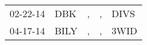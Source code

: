 \begin{supertabular}{p{0.07\textwidth}p{0.06\textwidth}p{0.02\textwidth}p{0.02\textwidth}p{0.06\textwidth}}
 02-22-14\textsuperscript{} &   DBK\textsuperscript{} &  , &  , &  DIVS\textsuperscript{} \\
 04-17-14\textsuperscript{} &  BILY\textsuperscript{} &  , &  , &  3WID\textsuperscript{} \\
\end{supertabular}
